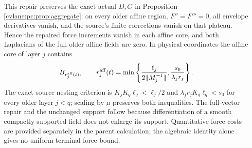 This repair preserves the exact actual $D,G$ in Proposition \ref{cvlane:pc:prop:aggregate}: on every older affine region, $F''=F'''=0$, all envelope derivatives vanish, and the source's finite corrections vanish on that plateau. Hence the repaired force increments vanish in each affine core, and both Laplacians of the full older affine fields are zero. In physical coordinates the affine core of layer $j$ contains
\[
 B_{r_j^{\rm aff}(t)},\qquad r_j^{\rm aff}(t)=
 \min\left\{\frac{\ell_j}{2\|M_j^{-1}\|},\frac{s_0}{\lambda_jr_j}\right\}.
\]
The exact source nesting criterion is $K_jK_q\ell_q<\ell_j/2$ and $\lambda_jr_jK_q\ell_q<s_0$ for every older layer $j<q$; scaling by $\mu$ preserves both inequalities. The full-vector repair and the unchanged support follow because differentiation of a smooth compactly supported field does not enlarge its support. Quantitative force costs are provided separately in the parent calculation; the algebraic identity alone gives no uniform terminal force bound.

